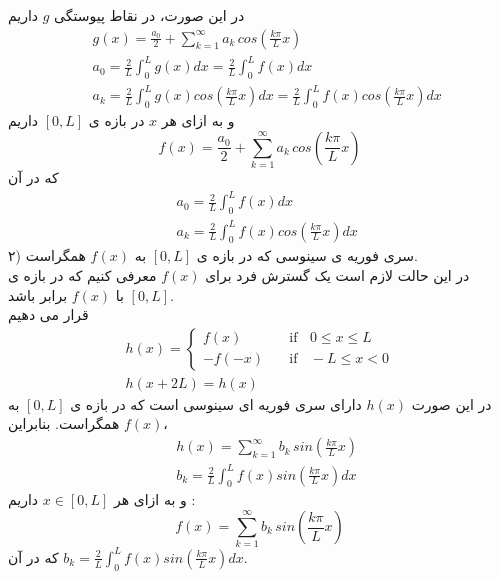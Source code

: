 در این صورت، در نقاط پیوستگی 
$g$
داریم
\begin{equation*}
	\begin{aligned}
		{} &\
		g(x)=\frac{a_0}{2}+\sum_{k=1}^\infty{a_k \, cos\left(\frac{k\pi}{L}x\right)}
		\\ &\
		a_0=\frac{2}{L}\int_0^{L}{g(x)dx}=\frac{2}{L}\int_0^{L}{f(x)dx}
		\\ &\
		a_k=\frac{2}{L}\int_0^L{g(x)cos\left(\frac{k\pi}{L}x\right)dx}=\frac{2}{L}\int_0^L{f(x)cos\left(\frac{k\pi}{L}x\right)dx}
	\end{aligned}
\end{equation*}
و به ازای هر 
$x$
در بازه ی
$[0,L]$
داریم
\[
f(x)=\frac{a_0}{2}+\sum_{k=1}^{\infty}{a_k\, cos\left(\frac{k\pi}{L}x\right)}
\]
که در آن
\begin{equation*}
	\begin{aligned}
		{} &\
		a_0=\frac{2}{L}\int_0^{L}{f(x)dx}
		\\ &\
		a_k=\frac{2}{L}\int_0^L{f(x)cos\left(\frac{k\pi}{L}x\right)dx}
	\end{aligned}
\end{equation*}
۲) سری فوریه ی سینوسی که در بازه ی
$[0,L]$
به
$f(x)$
همگراست.\\
در این حالت لازم است یک گسترش فرد برای
$f(x)$
معرفی کنیم که در بازه ی
$[0,L]$
با 
$f(x)$
برابر باشد.\\
قرار می دهیم
\begin{equation*}
	\begin{gathered}
		h(x) =
		\begin{cases}
			f(x)       & \quad \text{if }\;\; 0\le x\le L \\
			-f(-x)  & \quad \text{if }\;\; -L\le x< 0
		\end{cases}\\
		h(x+2L)=h(x)
	\end{gathered}
\end{equation*}
در این صورت
$h(x)$
دارای سری فوریه ای سینوسی است که در بازه ی
$[0,L]$
به
$f(x)$
همگراست. بنابراین،
\begin{equation*}
	\begin{aligned}
		{} &\
		h(x)=\sum_{k=1}^\infty{b_k \, sin\left(\frac{k\pi}{L}x\right)}
		\\ &\
		b_k=\frac{2}{L}\int_0^L{f(x)sin\left(\frac{k\pi}{L}x\right)dx}
	\end{aligned}
\end{equation*}
و به ازای هر 
$x\in[0,L]$
داریم :
\[
f(x)=\sum_{k=1}^\infty{b_k \, sin\left(\frac{k\pi}{L}x\right)}
\]
که در آن
$b_k=\frac{2}{L}\int_0^L{f(x)sin\left(\frac{k\pi}{L}x\right)dx}$.\\
